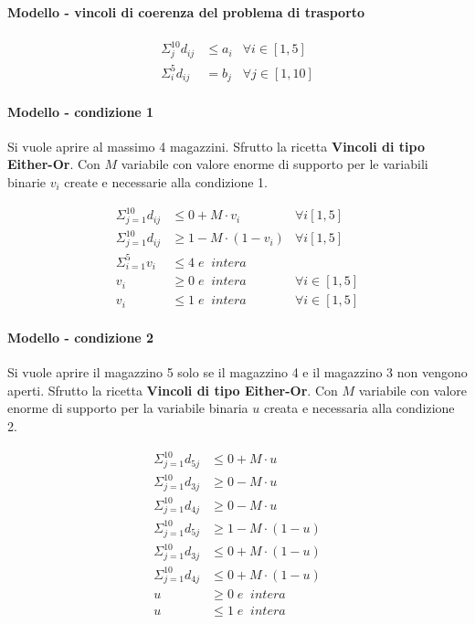 \documentclass[a4paper,12pt,oneside]{article}
\begin{document}
    \paragraph{Modello - vincoli di coerenza del problema di trasporto}
    \begin{align*}
        \Sigma ^ {10} _ {j} d_{ij} &\leq a_{i} & \forall i \in [1,5] \\
        \Sigma ^ {5} _ {i} d_{ij} &= b_{j} & \forall j \in [1,10]
    \end{align*}
 
    \paragraph{Modello - condizione 1}
    
    Si vuole aprire al massimo 4 magazzini. Sfrutto la ricetta \textbf{Vincoli di tipo Either-Or}.
    Con $M$ variabile con valore enorme di supporto per le variabili binarie $v_i$ create e necessarie alla condizione 1.
    
    \begin{align*}
        \Sigma ^ {10} _ {j=1} d_{ij} &\leq 0 + M \cdot v_i & \forall i [1,5] \\
        \Sigma ^ {10} _ {j=1} d_{ij} &\geq 1 - M \cdot (1 - v_i) & \forall i [1,5] \\
        \Sigma ^ {5} _ {i=1} v_i &\leq 4 \; e \;\; intera \\
        v_i &\geq 0 \; e \;\; intera & \forall i \in [1,5] \\
        v_i &\leq 1 \; e \;\; intera & \forall i \in [1,5]
    \end{align*}

    \paragraph{Modello - condizione 2}
    Si vuole aprire il magazzino 5 solo se il magazzino 4 e il magazzino 3 non vengono aperti.
    Sfrutto la ricetta \textbf{Vincoli di tipo Either-Or}.
    Con $M$ variabile con valore enorme di supporto per la variabile binaria $u$ creata e necessaria alla condizione 2.

    \begin{align*}
        \Sigma ^ {10} _ {j=1} d_{5j} &\leq 0 + M \cdot u \\
        \Sigma ^ {10} _ {j=1} d_{3j} &\geq 0 - M \cdot u \\
        \Sigma ^ {10} _ {j=1} d_{4j} &\geq 0 - M \cdot u \\
        \Sigma ^ {10} _ {j=1} d_{5j} &\geq 1 - M \cdot (1 - u) \\
        \Sigma ^ {10} _ {j=1} d_{3j} &\leq 0 + M \cdot (1 - u) \\
        \Sigma ^ {10} _ {j=1} d_{4j} &\leq 0 + M \cdot (1 - u) \\
        u &\geq 0 \; e \;\; intera \\
        u &\leq 1 \; e \;\; intera
    \end{align*}
\end{document}
